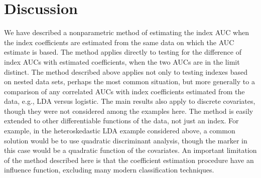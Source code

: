 \documentclass[12pt]{article}
\theoremstyle{definition}
\begin{document}
\section{Discussion}
We have described a nonparametric method of estimating the index AUC
when the index coefficients are estimated from the same data on which
the AUC estimate is based. The method applies directly to testing for
the difference of index AUCs with estimated coefficients, when the two
AUCs are in the limit distinct. The method described above applies not
only to testing indexes based on nested data sets, perhaps the most
common situation, but more generally to a comparison of any correlated
AUCs with index coefficients estimated from the data, e.g., LDA versus
logistic. The main results also apply to discrete covariates, though
they were not considered among the examples here. The method is easily
extended to other differentiable functions of the data, not just an
index. For example, in the heteroskedastic LDA example considered
above, a common solution would be to use quadratic discriminant
analysis, though the marker in this case would be a quadratic function
of the covariates. An important limitation of the method described
here is that the coefficient estimation procedure have an influence
function, excluding many modern classification techniques.





\end{document}
